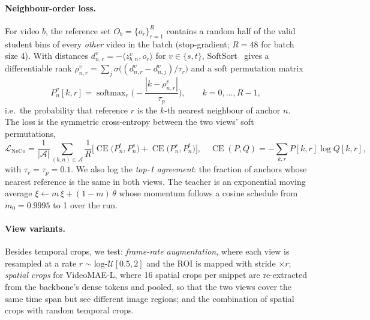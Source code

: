 \documentclass[10pt,a4paper]{article}
\begin{document}
\paragraph{Neighbour-order loss.} For video $b$, the reference set $O_b=\{o_r\}_{r=1}^{R}$
contains a random half of the valid student bins of every \emph{other} video in the batch
(stop-gradient; $R=48$ for batch size 4). With distances $d^{v}_{n,r}=-\langle z^{v}_{b,n},
o_r\rangle$ for $v\in\{s,t\}$, SoftSort~\cite{prillo2020softsort} gives a differentiable
rank $\rho^{v}_{n,r}=\sum_{j}\sigma\big((d^{v}_{n,r}-d^{v}_{n,j})/\tau_r\big)$ and a soft
permutation matrix
\begin{equation}
P^{v}_{n}[k,r]=\operatorname{softmax}_r\!\Big(-\frac{|k-\rho^{v}_{n,r}|}{\tau_p}\Big),
\qquad k=0,\dots,R-1,
\end{equation}
i.e.\ the probability that reference $r$ is the $k$-th nearest neighbour of anchor $n$.
The loss is the symmetric cross-entropy between the two views' soft permutations,
\begin{equation}
\mathcal{L}_{\text{NeCo}}=\frac{1}{|\mathcal{A}|}\sum_{(b,n)\in\mathcal{A}}\frac{1}{R}
\Big[\operatorname{CE}\big(P^{t}_{n},P^{s}_{n}\big)+\operatorname{CE}\big(P^{s}_{n},P^{t}_{n}\big)\Big],
\quad \operatorname{CE}(P,Q)=-\sum_{k,r}P[k,r]\log Q[k,r],
\end{equation}
with $\tau_r=\tau_p=0.1$. We also log the \emph{top-1 agreement}: the fraction of anchors
whose nearest reference is the same in both views. The teacher is an exponential moving
average $\xi\leftarrow m\,\xi+(1-m)\,\theta$ whose momentum follows a cosine schedule from
$m_0=0.9995$ to 1 over the run.

\paragraph{View variants.} Besides temporal crops, we test: \emph{frame-rate
augmentation}, where each view is resampled at a rate $r\sim\text{log-}\mathcal{U}[0.5,2]$
and the ROI is mapped with stride $\times r$; \emph{spatial crops} for VideoMAE-L, where
16 spatial crops per snippet are re-extracted from the backbone's dense tokens and pooled,
so that the two views cover the same time span but see different image regions; and the
combination of spatial crops with random temporal crops.
\end{document}
